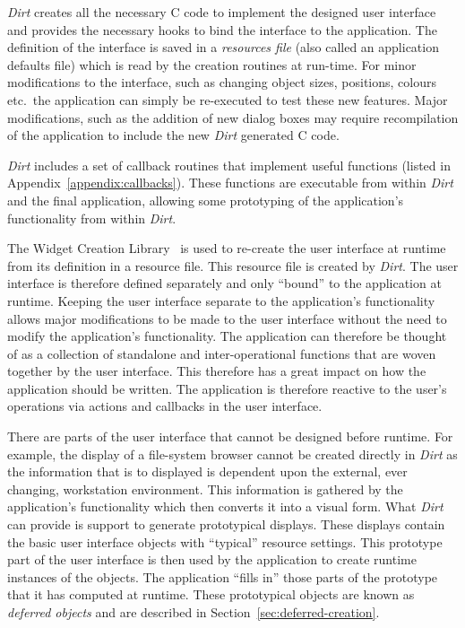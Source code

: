 {\em Dirt} creates all the necessary C code to implement the designed user
interface and provides the necessary hooks to bind the interface to the
application.  The definition of the interface is saved in a {\em resources
file} (also called an application defaults file) which is read by the
creation routines at run-time.  For minor modifications to the interface,
such as changing object sizes, positions, colours etc.\ the application can
simply be re-executed to test these new features. Major modifications, such as
the addition of new dialog boxes may require recompilation of the application
to include the new {\em Dirt} generated C code.

{\em Dirt} includes a set of callback routines that implement useful
functions (listed in Appendix~\ref{appendix:callbacks}).  These functions
are executable from within {\em Dirt} and the
final application, allowing some prototyping of the application's
functionality from within {\em Dirt}.

The Widget Creation Library~\cite{Wcl} is used to re-create the user
interface at runtime from its definition in a resource file. This
resource file is created by {\em Dirt}. The user interface is 
therefore defined separately and only
``bound'' to the application at runtime. Keeping the user interface
separate to the application's functionality allows major modifications to
be made to the user interface without the need to modify the application's
functionality. The application can therefore be thought of as a
collection of standalone and inter-operational functions that are woven
together by the user interface. This therefore has a great impact on how
the application should be written. The application is therefore reactive to
the user's operations via actions and callbacks in the user interface.

There are parts of the user interface that cannot be designed before
runtime. For example, the display of a file-system browser cannot be
created directly in {\em Dirt} as the information that is to displayed is
dependent upon the external, ever changing, workstation environment. This
information is gathered by the application's functionality which then
converts it into a visual form. What {\em Dirt} can provide is support to
generate prototypical displays. These displays contain the basic user
interface objects with ``typical'' resource settings. This prototype part of
the user interface is then used by the application to create runtime
instances of the objects. The application ``fills in'' those parts of the
prototype that it has computed at runtime. These prototypical objects are
known as {\em deferred objects} and are described in
Section~\ref{sec:deferred-creation}.

